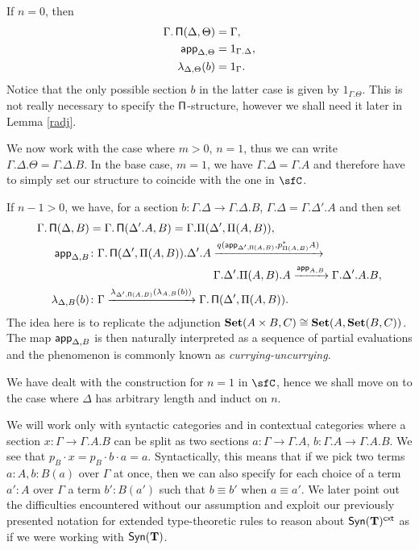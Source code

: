 \begin{construction}[Part 1]
  If $n=0$, then
  \begin{align*}
    \Gamma.\operatorname{\mathsf{\Pi}}(\Delta,\Theta) &=\Gamma, \\
    \operatorname{\mathsf{app}}_{\Delta,\Theta} &=1_{\Gamma.\Delta}, \\
    \lambda_{\Delta,\Theta}(b) &=1_\Gamma.
  \end{align*}
  Notice that the only possible section $b$ in the latter case is given by
  $1_{\Gamma.\Theta}$. This is not really necessary to specify the
  $\operatorname{\mathsf{\Pi}}$-structure, however we shall need it later in Lemma \ref{radj}.

  \noindent
  We now work with the case where $m>0$, $n=1$, thus we can write
  $\Gamma.\Delta.\Theta=\Gamma.\Delta.B$. In the base case, $m=1$, we have
  $\Gamma.\Delta=\Gamma.A$ and therefore have to simply set our structure to
  coincide with the one in $\sfC$.

  \noindent
  If $n-1>0$, we have, for a section
  $b\colon\Gamma.\Delta\rightarrow\Gamma.\Delta.B$,
  $\Gamma.\Delta=\Gamma.\Delta'.A$ and then set
  \begin{align*}
    \Gamma.\operatorname{\mathsf{\Pi}}(\Delta,B)
    &=\Gamma.\operatorname{\mathsf{\Pi}}(\Delta'.A,B)=\Gamma.\Pi(\Delta',\Pi(A,B)), \\
    \operatorname{\mathsf{app}}_{\Delta,B}
    &\colon
    \Gamma.\operatorname{\mathsf{\Pi}}(\Delta',\Pi(A,B)).\Delta'.A
                    \xrightarrow{q(\operatorname{\mathsf{app}}_{\Delta',\operatorname{\mathsf{\Pi}}(A,B)},p^*_{\Pi(A,B)}A)} \\
    &\quad\quad\quad\quad\quad\quad\quad\quad\quad\quad\quad
    \Gamma.\Delta'.\Pi(A,B).A
    \xrightarrow{\operatorname{\mathsf{app}}_{A,B}}
    \Gamma.\Delta'.A.B, \\
    \lambda_{\Delta,B}(b)
    &\colon
    \Gamma
    \xrightarrow{\lambda_{\Delta',\operatorname{\mathsf{\Pi}}(A,B)}(\lambda_{A,B}(b))}
    \Gamma.\operatorname{\mathsf{\Pi}}(\Delta',\Pi(A,B)).
  \end{align*}
  The idea here is to replicate the adjunction $\operatorname{\mathbf{Set}}(A\times
  B,C)\cong\operatorname{\mathbf{Set}}(A,\operatorname{\mathbf{Set}}(B,C))$. The map $\operatorname{\mathsf{app}}_{\Delta,B}$ is then naturally
  interpreted as a sequence of partial evaluations and the phenomenon is
  commonly known as \emph{currying-uncurrying}.
\end{construction}

  \noindent
  We have dealt with the construction for $n=1$ in $\sfC$, hence we shall move
  on to the case where $\Delta$ has arbitrary length and induct on $n$.

  \noindent
We will work only with syntactic categories and in contextual categories where a
section $x\colon\Gamma\rightarrow\Gamma.A.B$ can be split as
two sections $a\colon\Gamma\rightarrow\Gamma.A$,
$b\colon\Gamma.A\rightarrow\Gamma.A.B$.
We see that $p_B\cdot x=p_B\cdot b\cdot a=a$. Syntactically, this means that if
we pick two terms $a:A,b:B(a)$ over $\Gamma$ at once, then we can also
specify for each choice of a term $a':A$ over $\Gamma$ a term $b':B(a')$ such
that $b\equiv b'$ when $a\equiv a'$. We later point out the
difficulties encountered without our assumption and exploit our previously
presented notation for extended type-theoretic rules to reason about
$\mathsf{Syn}(\mathbf{T})^{\operatorname{\mathsf{cxt}}}$ as if we were working with $\mathsf{Syn}(\mathbf{T})$.

